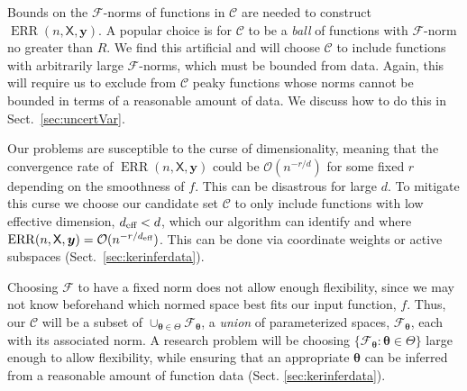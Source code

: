 \documentclass[11pt]{NSFamsart}
\newcommand{\eff}{\textup{eff}}
\DeclareMathOperator{\ERR}{ERR}
\newcommand{\mX}{\mathsf{X}}
\newcommand{\by}{{\boldsymbol{y}}}
\newcommand{\btheta}{{\boldsymbol{\theta}}}
\newcommand{\calc}{{\mathcal{C}}}
\newcommand{\calf}{{\mathcal{F}}}
\newcommand{\Order}{\mathcal{O}}
\begin{document}
Bounds on the $\calf$-norms of functions in  $\calc$ are needed to construct $\ERR(n,\mX,\by)$.  A popular choice is for $\calc$ to be a \emph{ball} of functions with $\calf$-norm no greater than $R$.  We find this artificial and will choose $\calc$ to include functions with arbitrarily large $\calf$-norms, which must be bounded from data.  Again, this will require us to exclude from $\calc$  peaky functions whose norms cannot be bounded in terms of a reasonable amount of data.  We discuss how to do this in Sect.\ \ref{sec:uncertVar}.

Our problems are susceptible to the curse of dimensionality, meaning that the convergence rate of $\ERR(n,\mX,\by)$ could be $\Order(n^{-r/d})$ for some fixed $r$ depending on the smoothness of $f$.  
This can be disastrous for large $d$.  
To mitigate this curse we choose our candidate set $\calc$ to only include functions with low effective dimension, $d_\eff < d$, which our algorithm can identify and where $\ERR(n,\mX,\by) = \Order(n^{-r/d_\eff})$.  This can be done via coordinate weights or active subspaces (Sect.\ \ref{sec:kerinferdata}). 

Choosing  $\calf$ to have a fixed norm does not allow enough flexibility, since we may not know beforehand which normed space best fits our input function, $f$.  Thus, our $\calc$ will  be a subset of $\cup_{\btheta \in \Theta} \calf_\btheta$, a \emph{union} of parameterized spaces, $\calf_\btheta$, each with its associated norm.  A research problem will be choosing $\{\calf_\btheta : \btheta \in \Theta\}$ large enough to allow flexibility, while ensuring that an appropriate $\btheta$ can be inferred from a reasonable amount of function data (Sect. \ref{sec:kerinferdata}).
\end{document}
